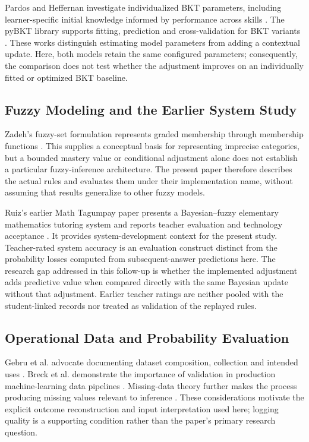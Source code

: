 \documentclass[conference]{IEEEtran}
\begin{document}
Pardos and Heffernan investigate individualized BKT parameters, including learner-specific initial knowledge informed by performance across skills \cite{pardos2010individualization}. The pyBKT library supports fitting, prediction and cross-validation for BKT variants \cite{badrinath2021pybkt}. These works distinguish estimating model parameters from adding a contextual update. Here, both models retain the same configured parameters; consequently, the comparison does not test whether the adjustment improves on an individually fitted or optimized BKT baseline.

\subsection{Fuzzy Modeling and the Earlier System Study}
Zadeh's fuzzy-set formulation represents graded membership through membership functions \cite{zadeh1965}. This supplies a conceptual basis for representing imprecise categories, but a bounded mastery value or conditional adjustment alone does not establish a particular fuzzy-inference architecture. The present paper therefore describes the actual rules and evaluates them under their implementation name, without assuming that results generalize to other fuzzy models.

Ruiz's earlier Math Tagumpay paper presents a Bayesian--fuzzy elementary mathematics tutoring system and reports teacher evaluation and technology acceptance \cite{ruiz2026}. It provides system-development context for the present study. Teacher-rated system accuracy is an evaluation construct distinct from the probability losses computed from subsequent-answer predictions here. The research gap addressed in this follow-up is whether the implemented adjustment adds predictive value when compared directly with the same Bayesian update without that adjustment. Earlier teacher ratings are neither pooled with the student-linked records nor treated as validation of the replayed rules.

\subsection{Operational Data and Probability Evaluation}
Gebru et al. advocate documenting dataset composition, collection and intended uses \cite{gebru2021}. Breck et al. demonstrate the importance of validation in production machine-learning data pipelines \cite{breck2019validation}. Missing-data theory further makes the process producing missing values relevant to inference \cite{rubin1976}. These considerations motivate the explicit outcome reconstruction and input interpretation used here; logging quality is a supporting condition rather than the paper's primary research question.
\end{document}
